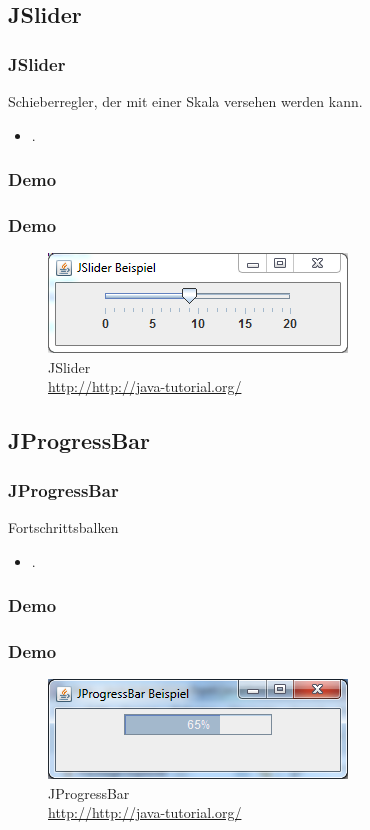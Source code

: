 \documentclass[xcolor=dvipsnames]{beamer}
\begin{document}
\subsection{JSlider}
\begin{frame} %
  \frametitle{JSlider
} %
  \begin{block}{Schieberregler, der mit einer Skala versehen werden kann.}
	  \begin{itemize}
		\item .
	  \end{itemize}
  \end{block}
\end{frame}

\subsubsection{Demo}
\begin{frame}
  \frametitle{Demo}
	\begin{figure}
		\includegraphics[scale=1.0]{images/jslider.PNG}
		\caption{JSlider \\ \tiny{\textcolor{gray}{\url{http://http://java-tutorial.org/}}}}
		\end{figure}
\end{frame}


\subsection{JProgressBar}
\begin{frame} %
  \frametitle{JProgressBar} %
  \begin{block}{Fortschrittsbalken}
	  \begin{itemize}
		\item .
	  \end{itemize}
  \end{block}
\end{frame}

\subsubsection{Demo}
\begin{frame}
  \frametitle{Demo}
	\begin{figure}
		\includegraphics[scale=1.0]{images/jprogressbar.PNG}
		\caption{JProgressBar \\ \tiny{\textcolor{gray}{\url{http://http://java-tutorial.org/}}}}
		\end{figure}
\end{frame}
\end{document}
